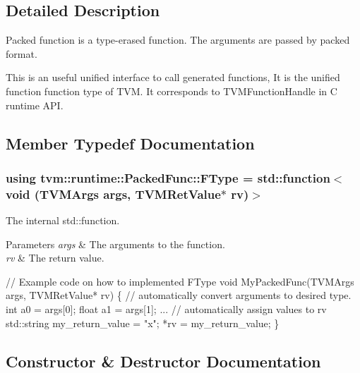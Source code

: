 \subsection{Detailed Description}
Packed function is a type-\/erased function. The arguments are passed by packed format. 

This is an useful unified interface to call generated functions, It is the unified function function type of T\+VM. It corresponds to T\+V\+M\+Function\+Handle in C runtime A\+PI. 

\subsection{Member Typedef Documentation}
\subsubsection[{\texorpdfstring{F\+Type}{FType}}]{\setlength{\rightskip}{0pt plus 5cm}using {\bf tvm\+::runtime\+::\+Packed\+Func\+::\+F\+Type} =  std\+::function$<$void ({\bf T\+V\+M\+Args} args, {\bf T\+V\+M\+Ret\+Value}$\ast$ rv)$>$}\hypertarget{classtvm_1_1runtime_1_1PackedFunc_ae5f951a6a515f3e3a7493c27704b7849}{}\label{classtvm_1_1runtime_1_1PackedFunc_ae5f951a6a515f3e3a7493c27704b7849}


The internal std\+::function. 


\begin{DoxyParams}{Parameters}
{\em args} & The arguments to the function. \\
\hline
{\em rv} & The return value.\\
\hline
\end{DoxyParams}

\begin{DoxyCode}
\textcolor{comment}{// Example code on how to implemented FType}
\textcolor{keywordtype}{void} MyPackedFunc(TVMArgs args, TVMRetValue* rv) \{
  \textcolor{comment}{// automatically convert arguments to desired type.}
  \textcolor{keywordtype}{int} a0 = args[0];
  \textcolor{keywordtype}{float} a1 = args[1];
  ...
  \textcolor{comment}{// automatically assign values to rv}
  std::string my\_return\_value = \textcolor{stringliteral}{"x"};
  *rv = my\_return\_value;
\}
\end{DoxyCode}
 

\subsection{Constructor \& Destructor Documentation}
